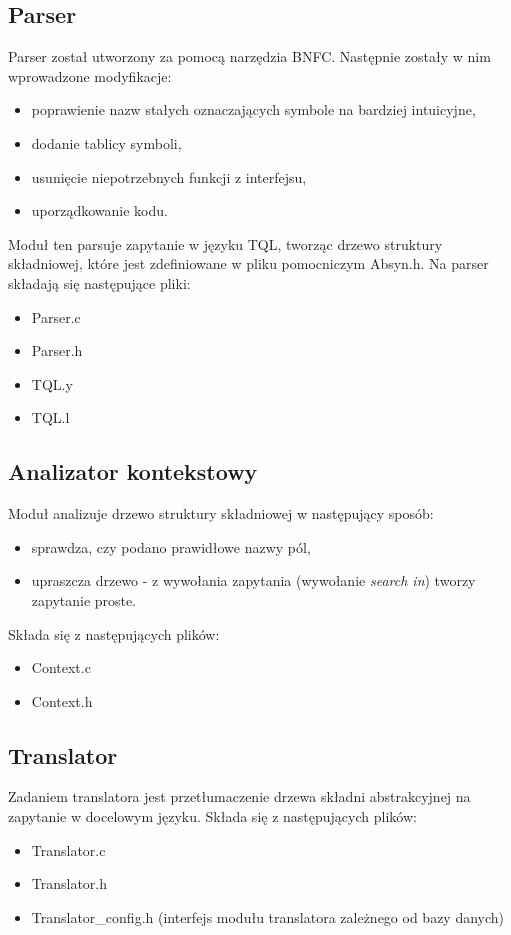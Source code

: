 \documentclass{pracamgr}
\begin{document}
\subsection{Parser}
Parser został utworzony za pomocą narzędzia BNFC. Następnie zostały w nim wprowadzone modyfikacje:
\begin{itemize}
\item poprawienie nazw stałych oznaczających symbole na bardziej intuicyjne,
\item dodanie tablicy symboli,
\item usunięcie niepotrzebnych funkcji z interfejsu,
\item uporządkowanie kodu.
\end{itemize}
Moduł ten parsuje zapytanie w języku TQL, tworząc drzewo struktury składniowej, które jest zdefiniowane w pliku pomocniczym Absyn.h.
Na parser składają się następujące pliki:
\begin{itemize}
 \item Parser.c
 \item Parser.h
 \item TQL.y %
 \item TQL.l %
\end{itemize}

\subsection{Analizator kontekstowy}
Moduł analizuje drzewo struktury składniowej w następujący sposób:
\begin{itemize}
 \item sprawdza, czy podano prawidłowe nazwy pól,  %
\item upraszcza drzewo - z wywołania zapytania (wywołanie \textit{search in}) tworzy zapytanie proste.
\end{itemize}
Składa się z następujących plików:
\begin{itemize}
 \item Context.c
 \item Context.h
\end{itemize}

\subsection{Translator}
Zadaniem translatora jest przetłumaczenie drzewa składni abstrakcyjnej na zapytanie w docelowym języku. 
Składa się z następujących plików:
\begin {itemize}
 \item Translator.c
 \item Translator.h
 \item Translator\_config.h (interfejs modułu translatora zależnego od bazy danych)
\end {itemize}
\end{document}
